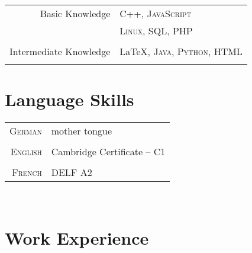 \documentclass[a4paper,10pt]{article} %
\begin{document}
{\begin{minipage}[t]{0.44\textwidth}
\begin{tabular}{rl}
Basic Knowledge         & \textsc{C++}, \textsc{JavaScript}\\
                        & \textsc{Linux}, \textsc{SQL}, \textsc{PHP}\\ \\
Intermediate Knowledge
                        & \LaTeX, \textsc{Java}, \textsc{Python}, \textsc{HTML}\\ \\
\end{tabular}


\section{Language Skills} 

\begin{tabular}{rl}
\textsc{German}
& mother tongue\\
& \\
\textsc{English}
& Cambridge Certificate – C1\\
& \\
\textsc{French}
& DELF A2 \\
\end{tabular}\\[10pt]

	
\end{minipage} %

\begin{minipage}[t]{0.5\textwidth}
\vspace{0pt} %
	

\section{Work Experience} 


\end{minipage}}
\end{document}
